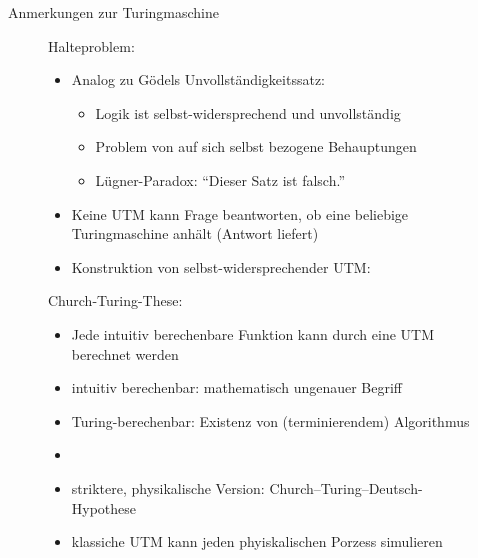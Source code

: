 \documentclass[aspectratio=1610, 9pt]{beamer}
\begin{document}
\begin{frame}{Anmerkungen zur Turingmaschine}
  \begin{figure}
    \begin{minipage}{0.49\textwidth}
      Halteproblem:
      \begin{itemize}
        \item Analog zu Gödels Unvollständigkeitssatz:
        \begin{itemize}
          \item Logik ist selbst-widersprechend und unvollständig
          \item Problem von auf sich selbst bezogene Behauptungen
          \item Lügner-Paradox: \enquote{Dieser Satz ist falsch.}
        \end{itemize}
        \item Keine UTM kann Frage beantworten, ob eine beliebige Turingmaschine anhält (Antwort liefert)
        \item Konstruktion von selbst-widersprechender UTM:
      \end{itemize}
      \begin{algorithm}[H]
      \end{algorithm}
    \end{minipage}
    \hfill
    \begin{minipage}{0.49\textwidth}
      Church-Turing-These:
      \begin{itemize}
        \item Jede intuitiv berechenbare Funktion kann durch eine UTM berechnet werden
        \item intuitiv berechenbar: mathematisch ungenauer Begriff
        \item Turing-berechenbar: Existenz von (terminierendem) Algorithmus
        \item[]
        \item striktere, physikalische Version: Church–Turing–Deutsch-Hypothese
        \item klassiche UTM kann jeden phyiskalischen Porzess simulieren
      \end{itemize}
    \end{minipage}
  \end{figure}
\end{frame}
\end{document}
